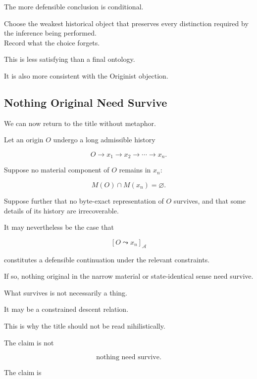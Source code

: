\documentclass[
  11pt,
  a4paper,
  DIV=12,
  BCOR=0mm,
  parskip=half-
]{scrartcl}
\newcommand{\Adm}{\mathcal A}
\theoremstyle{definition}
\theoremstyle{plain}
\theoremstyle{remark}
\begin{document}
The more defensible conclusion is conditional.

\begin{held}
\centering
Choose the weakest historical object that preserves every distinction required
by the inference being performed.\\[3pt]
Record what the choice forgets.
\end{held}

This is less satisfying than a final ontology.

It is also more consistent with the Originist objection.


\subsection{Nothing Original Need Survive}
\label{sec:nothing-original}

We can now return to the title without metaphor.

Let an origin \(O\) undergo a long admissible history

\[
  O
  \to
  x_1
  \to
  x_2
  \to
  \cdots
  \to
  x_n.
\]

Suppose no material component of \(O\) remains in \(x_n\):

\[
  M(O)\cap M(x_n)=\varnothing.
\]

Suppose further that no byte-exact representation of \(O\) survives, and that
some details of its history are irrecoverable.

It may nevertheless be the case that

\[
  [O\leadsto x_n]_{\Adm}
\]

constitutes a defensible continuation under the relevant constraints.

If so, nothing original in the narrow material or state-identical sense need
survive.

What survives is not necessarily a thing.

It may be a constrained descent relation.

This is why the title should not be read nihilistically.

The claim is not

\[
  \text{nothing need survive}.
\]

The claim is
\end{document}
